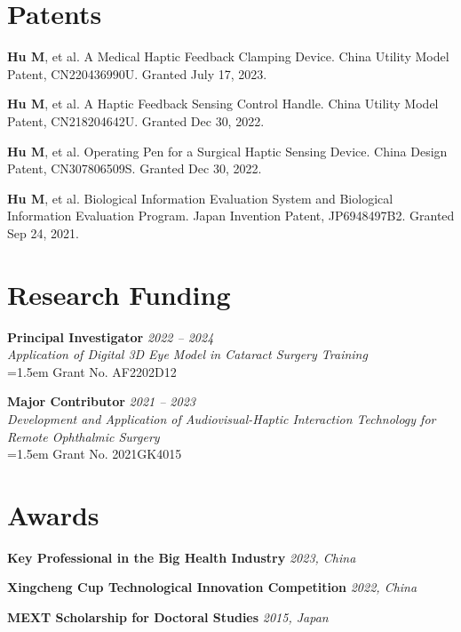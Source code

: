 \documentclass[11pt, a4paper]{scrartcl}
\newcommand{\workentry}[4]{%
    \noindent\textbf{#2} \hfill \textit{\color{gray} #1} \\
    \textit{#3} \\
    \vspace{0.5ex}
    \noindent\hangindent=1.5em\hangafter=0 \small #4 \normalsize\par
    \vspace{1.5ex}
}
\newcommand{\awardentry}[3]{%
    \noindent\textbf{#1} \hfill \textit{\color{gray} #2, #3}\par
    \vspace{1.5ex}
}
\begin{document}
\section*{Patents}
{\small
\begin{enumerate}[label={[\arabic*]}, leftmargin=*, itemsep=1ex]
    \item \textbf{Hu M}, et al. A Medical Haptic Feedback Clamping Device. China Utility Model Patent, CN220436990U. Granted July 17, 2023.
    \item \textbf{Hu M}, et al. A Haptic Feedback Sensing Control Handle. China Utility Model Patent, CN218204642U. Granted Dec 30, 2022.
    \item \textbf{Hu M}, et al. Operating Pen for a Surgical Haptic Sensing Device. China Design Patent, CN307806509S. Granted Dec 30, 2022.
    \item \textbf{Hu M}, et al. Biological Information Evaluation System and Biological Information Evaluation Program. Japan Invention Patent, JP6948497B2. Granted Sep 24, 2021.
\end{enumerate}
}

\section*{Research Funding}
\workentry{2022 -- 2024}
    {Principal Investigator}
    {Application of Digital 3D Eye Model in Cataract Surgery Training}
    {Grant No. AF2202D12}

\workentry{2021 -- 2023}
    {Major Contributor}
    {Development and Application of Audiovisual-Haptic Interaction Technology for Remote Ophthalmic Surgery}
    {Grant No. 2021GK4015}
    
\section*{Awards}
\awardentry{Key Professional in the Big Health Industry}{2023}{China}
\awardentry{Xingcheng Cup Technological Innovation Competition}{2022}{China}
\awardentry{MEXT Scholarship for Doctoral Studies}{2015}{Japan}
\end{document}
